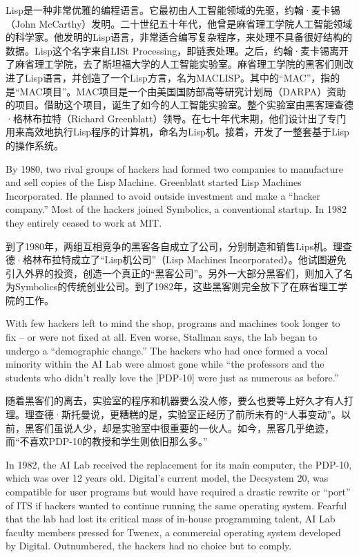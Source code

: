 \ifdefined\chs
Lisp是一种非常优雅的编程语言。它最初由人工智能领域的先驱，约翰·麦卡锡（John McCarthy）发明。二十世纪五十年代，他曾是麻省理工学院人工智能领域的科学家。他发明的Lisp语言，非常适合编写复杂程序，来处理不具备很好结构的数据。Lisp这个名字来自LISt Processing，即链表处理。之后，约翰·麦卡锡离开了麻省理工学院，去了斯坦福大学的人工智能实验室。麻省理工学院的黑客们则改进了Lisp语言，并创造了一个Lisp方言，名为MACLISP。其中的``MAC''，指的是``MAC项目''。MAC项目是一个由美国国防部高等研究计划局（DARPA）资助的项目。借助这个项目，诞生了如今的人工智能实验室。整个实验室由黑客理查德·格林布拉特（Richard Greenblatt）领导。在七十年代末期，他们设计出了专门用来高效地执行Lisp程序的计算机，命名为Lisp机。接着，开发了一整套基于Lisp的操作系统。
\fi

\ifdefined\eng
By 1980, two rival groups of hackers had formed two companies to manufacture and sell copies of the Lisp Machine.  Greenblatt started Lisp Machines Incorporated.  He planned to avoid outside investment and make a ``hacker company.''  Most of the hackers joined Symbolics, a conventional startup.  In 1982 they entirely ceased to work at MIT.
\fi

\ifdefined\chs
到了1980年，两组互相竞争的黑客各自成立了公司，分别制造和销售Lips机。理查德·格林布拉特成立了``Lisp机公司''（Lisp Machines Incorporated）。他试图避免引入外界的投资，创造一个真正的``黑客公司''。另外一大部分黑客们，则加入了名为Symbolics的传统创业公司。到了1982年，这些黑客则完全放下了在麻省理工学院的工作。
\fi

\ifdefined\eng
With few hackers left to mind the shop, programs and machines took longer to fix -- or were not fixed at all.  Even worse, Stallman says, the lab began to undergo a ``demographic change.'' The hackers who had once formed a vocal minority within the AI Lab were almost gone while ``the professors and the students who didn't really love the [PDP-10] were just as numerous as before.''
\fi

\ifdefined\chs
随着黑客们的离去，实验室的程序和机器要么没人修，要么也要等上好久才有人打理。理查德·斯托曼说，更糟糕的是，实验室正经历了前所未有的``人事变动''。以前，黑客们虽说人少，却是实验室中很重要的一伙人。如今，黑客几乎绝迹，而``不喜欢PDP-10的教授和学生则依旧那么多。''
\fi

\ifdefined\eng
In 1982, the AI Lab received the replacement for its main computer, the PDP-10, which was over 12 years old. Digital's current model, the Decsystem 20, was compatible for user programs but would have required a drastic rewrite or ``port'' of ITS if hackers wanted to continue running the same operating system. Fearful that the lab had lost its critical mass of in-house programming talent, AI Lab faculty members pressed for Twenex, a commercial operating system developed by Digital. Outnumbered, the hackers had no choice but to comply.
\fi

